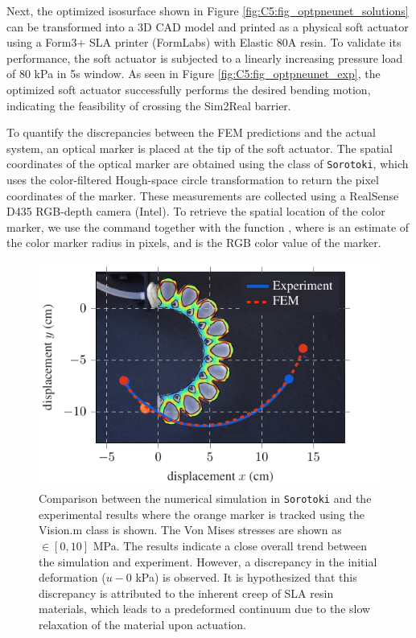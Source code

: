 Next, the optimized isosurface shown in Figure \ref{fig:C5:fig_optpneunet_solutions} can be transformed into a 3D CAD model and printed as a physical soft actuator using a Form3+ SLA printer (FormLabs) with Elastic 80A resin. To validate its performance, the soft actuator is subjected to a linearly increasing pressure load of 80 \si{\kilo \pascal} in 5\si{\second} window. As seen in Figure \ref{fig:C5:fig_optpneunet_exp}, the optimized soft actuator successfully performs the desired bending motion, indicating the feasibility of crossing the Sim2Real barrier.

To quantify the discrepancies between the FEM predictions and the actual system, an optical marker is placed at the tip of the soft actuator. The spatial coordinates of the optical marker are obtained using the  class of \texttt{Sorotoki}, which uses the color-filtered Hough-space circle transformation to return the pixel coordinates of the marker. These measurements are collected using a RealSense D435 RGB-depth camera (Intel). To retrieve the spatial location of the color marker, we use the command  together with the function , where  is an estimate of the color marker radius in pixels, and  is the RGB color value of the marker.

\begin{figure}[!t]
    \centering
    \includegraphics*[width=.8\textwidth]{./pdf/thesis-figure-6-25.pdf}
    \caption{\small Comparison between the numerical simulation in \texttt{Sorotoki} and the experimental results where the orange marker is tracked using the Vision.m class is shown. The Von Mises stresses are shown as \protect{}$\!\!\in [0,10]$ \si{\mega \pascal}. The results indicate a close overall trend between the simulation and experiment. However, a discrepancy in the initial deformation ($u - 0$ kPa) is observed. It is hypothesized that this discrepancy is attributed to the inherent creep of SLA resin materials, which leads to a predeformed continuum due to the slow relaxation of the material upon actuation. }
    \label{fig:C5:fig_optpneunet_exp_compare}
\end{figure}

